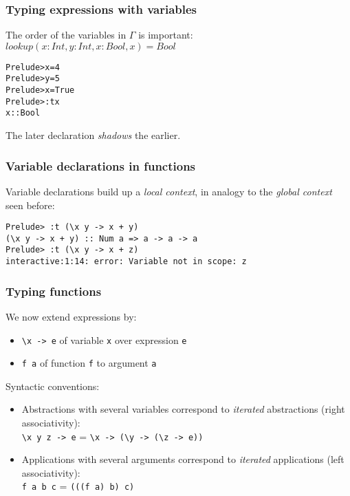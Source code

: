 \documentclass{beamer}
\begin{document}
\begin{frame}[fragile]\frametitle{Typing expressions with variables}

  The order of the variables in $\Gamma$ is important:\\
  $lookup(x: Int, y: Int, x: Bool, x) = Bool$

\begin{alltt}
Prelude> x = 4
Prelude> y = 5
Prelude> x = True
Prelude> :t x
x :: Bool
\end{alltt}
The later declaration \emph{shadows} the earlier.

\end{frame}


\begin{frame}[fragile]\frametitle{Variable declarations in functions}

Variable declarations build up a \emph{local context}, in analogy to the
\emph{global context} seen before:

\begin{verbatim}
Prelude> :t (\x y -> x + y)
(\x y -> x + y) :: Num a => a -> a -> a
Prelude> :t (\x y -> x + z)
interactive:1:14: error: Variable not in scope: z
\end{verbatim}

\end{frame}


\begin{frame}[fragile]\frametitle{Typing functions}

  We now extend expressions by:
  \begin{itemize}
  \item {} \verb|\x -> e| of variable \texttt{x} over
    expression \texttt{e}
  \item {} \texttt{f a} of function \texttt{f} to argument \texttt{a}
  \end{itemize}

  Syntactic conventions:
  \begin{itemize}
  \item Abstractions with several variables correspond to \emph{iterated}
    abstractions (right associativity):\\
    \verb|\x y z -> e| \hspace{3mm} = \hspace{3mm} \verb|\x -> (\y -> (\z -> e))|
  \item Applications with several arguments correspond to \emph{iterated}
    applications (left associativity):\\
    \texttt{f a b c}\hspace{3mm} = \hspace{3mm} \texttt{(((f a) b) c)}
  \end{itemize}
  
\end{frame}
\end{document}
